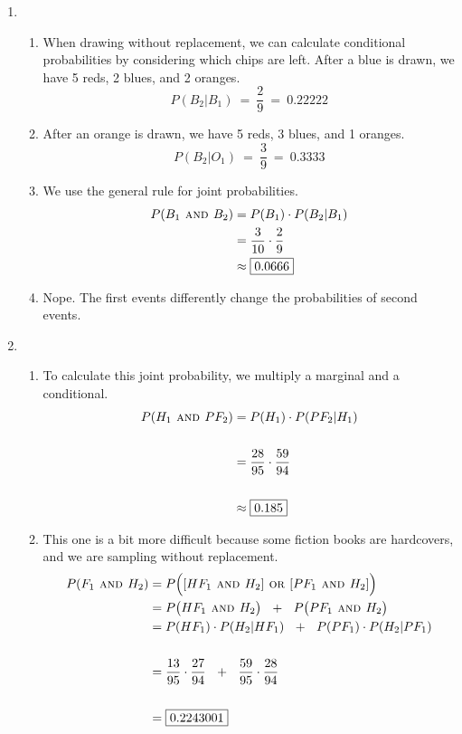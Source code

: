 \documentclass[12pt,letterpaper]{article}
\begin{document}
\begin{enumerate}
\item \begin{enumerate}
\item When drawing without replacement, we can calculate conditional probabilities by considering which chips are left. After a blue is drawn, we have 5 reds, 2 blues, and 2 oranges.
$$P(B_2 | B_1) ~=~ \frac{2}{9} ~=~ 0.22222 $$
\item After an orange is drawn, we have 5 reds, 3 blues, and 1 oranges.
$$P(B_2 | O_1) ~=~ \frac{3}{9} ~=~ 0.3333 $$
\item We use the general rule for joint probabilities.
\begin{align*}
P(B_1 \textsc{~and~} B_2) &= P(B_1)\cdot P(B_2|B_1) \\
&= \frac{3}{10} \cdot \frac{2}{9} \\
&\approx \fbox{0.0666}
\end{align*}
\item Nope. The first events differently change the probabilities of second events.
\end{enumerate}

\newpage

\item \begin{enumerate}
\item To calculate this joint probability, we multiply a marginal and a conditional.
\begin{align*}
P(H_1 \textsc{~and~} PF_2) &= P(H_1) \cdot P(PF_2 | H_1)  \\\\
&= \frac{28}{95} \cdot \frac{59}{94} \\\\
&\approx \fbox{0.185}
\end{align*}

\item This one is a bit more difficult because some fiction books are hardcovers, and we are sampling without replacement.
\begin{align*}
P(F_1 \textsc{~and~} H_2) &= P\Big([HF_1 \textsc{~and~} H_2] \textsc{~or~} [PF_1 \textsc{~and~} H_2] \Big) \\
&= P\big(HF_1 \textsc{~and~} H_2\big) ~~+~~ P\big(PF_1 \textsc{~and~} H_2\big)\\
&= P(HF_1)\cdot P(H_2|HF_1) ~~+~~  P(PF_1)\cdot P(H_2|PF_1)\\\\
&= \frac{13}{95}\cdot \frac{27}{94} ~~+~~ \frac{59}{95} \cdot \frac{28}{94}\\\\
&=  \fbox{0.2243001}
\end{align*}


\end{enumerate}
\end{enumerate}
\end{document}
